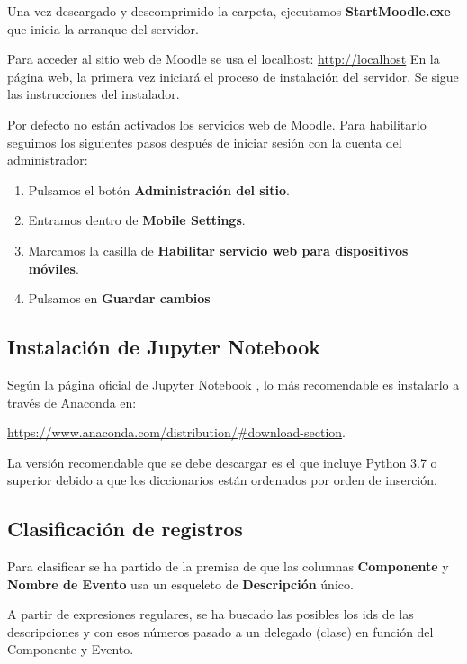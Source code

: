 Una vez descargado y descomprimido la carpeta, ejecutamos \textbf{StartMoodle.exe} que inicia la  arranque del servidor.

Para acceder al sitio web de Moodle se usa el localhost: \href{http://localhost}{http://localhost}
En la página web, la primera vez iniciará el proceso de instalación del servidor. Se sigue las instrucciones del instalador.

Por defecto no están activados los servicios web de Moodle. Para habilitarlo seguimos los siguientes pasos después de iniciar sesión con la cuenta del administrador:

\begin{enumerate}
	
	\item Pulsamos el botón \textbf{Administración del sitio}.
	\item Entramos dentro de \textbf{Mobile Settings}.
	\item Marcamos la casilla de \textbf{Habilitar servicio web para dispositivos móviles}.
	\item Pulsamos en \textbf{Guardar cambios}
\end{enumerate}

\subsection{Instalación de Jupyter Notebook}

Según la página oficial de Jupyter Notebook \cite{noauthor_project_nodate}, lo más recomendable es instalarlo a través de Anaconda en:

\href{https://www.anaconda.com/distribution/\#download-section}{https://www.anaconda.com/distribution/\#download-section}.

La versión recomendable que se debe descargar es el que incluye Python 3.7 o superior debido a que los diccionarios están ordenados por orden de inserción.

\subsection{Clasificación de registros}

Para clasificar se ha partido de la premisa de que las columnas \textbf{Componente} y \textbf{Nombre de Evento} usa un esqueleto de \textbf{Descripción} único. 

A partir de expresiones regulares, se ha buscado las posibles los ids de las descripciones y con esos números pasado a un delegado (clase) en función del Componente y Evento. 

